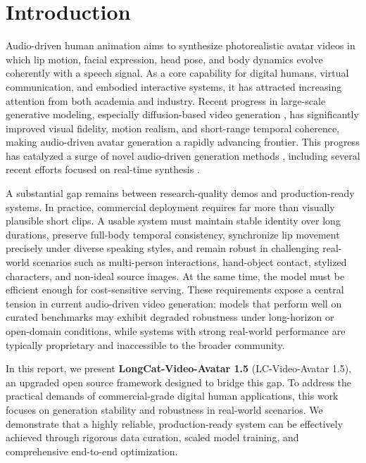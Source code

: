 \section{Introduction}


Audio-driven human animation aims to synthesize photorealistic avatar videos in which lip motion, facial expression, head pose, and body dynamics evolve coherently with a speech signal. As a core capability for digital humans, virtual communication, and embodied interactive systems, it has attracted increasing attention from both academia and industry. Recent progress in large-scale generative modeling, especially diffusion-based video generation \cite{wang2025fantasytalking,kong2025let,jiang2025omnihuman,team2025longcat}, has significantly improved visual fidelity, motion realism, and short-range temporal coherence, making audio-driven avatar generation a rapidly advancing frontier. This progress has catalyzed a surge of novel audio-driven generation methods \cite{gao2025wan,yang2025infinitetalk,chen2025hunyuanvideo,kong2025let,gan2025omniavatar, flowvqtalker}, including several recent efforts focused on real-time synthesis \cite{li2025joyavatar,li2025personalive,huang2025live,shen2025soulxflashtalktechnicalreport,zeng2026lpm}.

A substantial gap remains between research-quality demos and production-ready systems. In practice, commercial deployment requires far more than visually plausible short clips. A usable system must maintain stable identity over long durations, preserve full-body temporal consistency, synchronize lip movement precisely under diverse speaking styles, and remain robust in challenging real-world scenarios such as multi-person interactions, hand-object contact, stylized characters, and non-ideal source images. At the same time, the model must be efficient enough for cost-sensitive serving. These requirements expose a central tension in current audio-driven video generation: models that perform well on curated benchmarks may exhibit degraded robustness under long-horizon or open-domain conditions, while systems with strong real-world performance are typically proprietary and inaccessible to the broader community.

In this report, we present \textbf{LongCat-Video-Avatar 1.5} (LC-Video-Avatar 1.5), an upgraded open source framework designed to bridge this gap. To address the practical demands of commercial-grade digital human applications, this work focuses on generation stability and robustness in real-world scenarios. We demonstrate that a highly reliable, production-ready system can be effectively achieved through rigorous data curation, scaled model training, and comprehensive end-to-end optimization.


